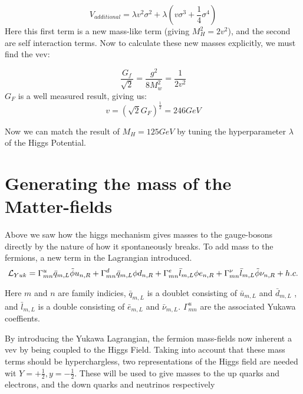 \begin{equation*}
    V_{additional} = \lambda v^2 \sigma^2 + \lambda(v \sigma^3 +\frac{1}{4}\sigma^4)
\end{equation*}
Here this first term is a new mass-like term (giving $M_H^2 = 2 v^2$), and the second are self interaction terms. Now to calculate these new masses explicitly, we must find the vev:

\begin{equation*}
    \frac{G_f}{\sqrt{2}} = \frac{g^2}{8 M_w^2} = \frac{1}{2 v^2}
\end{equation*}
$G_F $ is a well measured result, giving us:
\begin{equation*}
    v= (\sqrt{2}G_F)^\frac{1}{2} = 246 GeV
\end{equation*}

Now we can match the result of $M_H = 125 GeV$ by tuning the hyperparameter $\lambda$ of the Higgs Potential. 



\section{Generating the mass of the Matter-fields}

Above we saw how the higgs mechanism gives masses to the gauge-bosons directly by the nature of how it spontaneously breaks. To add mass to the fermions, a new term in the Lagrangian introduced. 
\begin{equation*}
    \mathcal{L}_{Yuk} = \Gamma_{mn}^{u}\bar{q}_{m,L}\Tilde{\phi}u_{n,R} + \Gamma_{mn}^{d}\bar{q}_{m,L}\phi d_{n,R} + \Gamma_{mn}^{e}\bar{l}_{m,L}\phi e_{n,R} + \Gamma_{mn}^{\nu}\bar{l}_{m,L}\Tilde{\phi}\nu_{n,R} + h.c.
\end{equation*}

Here $m$ and $n$ are family indicies, $\bar{q}_{m,L}$ is a doublet consisting of $\bar{u}_{m,L}$ and $\bar{d}_{m,L}$ , and $\bar{l}_{m,L}$ is a double consisting of $\bar{e}_{m,L}$ and $\bar{\nu}_{m,L}$. $\Gamma_{mn}^{u}$ are the associated Yukawa coeffients. 



By introducing the Yukawa Lagrangian, the fermion mass-fields now inherent a vev by being coupled to the Higgs Field. Taking into account that these mass terms should be hyperchargless, two representations of the Higgs field are needed wit $Y = +\frac{1}{2} , y = -\frac{1}{2} $. These will be used to give masses to the up quarks and electrons, and the down quarks and neutrinos respectively

